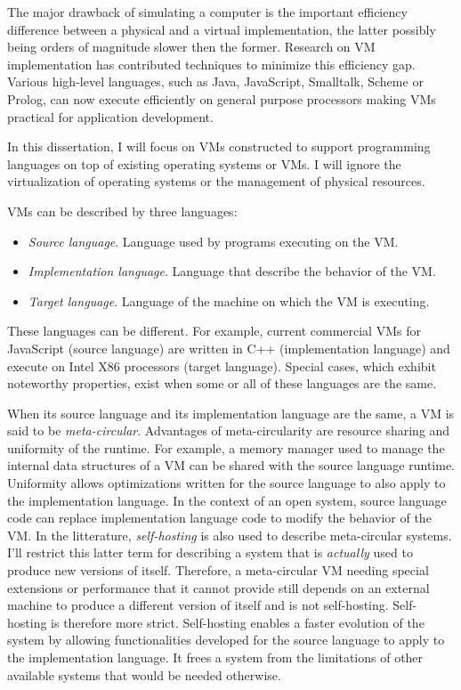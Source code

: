 The major drawback of simulating a computer is the important efficiency
difference between a physical and a virtual implementation, the latter possibly
being orders of magnitude slower then the former. Research on VM
implementation has contributed techniques to minimize this efficiency gap.
Various high-level languages, such as Java, JavaScript, Smalltalk, Scheme or
Prolog, can now execute efficiently on general purpose processors making VMs
practical for application development.

In this dissertation, I will focus on VMs constructed to support programming
languages on top of existing operating systems or VMs. I will ignore the
virtualization of operating systems or the management of physical resources.

VMs can be described by three languages:
\begin{itemize}
    \item \textit{Source language}. Language used by programs executing on the VM.
    \item \textit{Implementation language}. Language that describe the behavior of the VM.
    \item \textit{Target language}. Language of the machine on which the VM is executing.
\end{itemize}
These languages can be different. For example, current commercial VMs for
JavaScript (source language) are written in C++ (implementation language) and
execute on Intel X86 processors (target language). Special cases, which exhibit
noteworthy properties, exist when some or all of these languages are the same. 

When its source language and its implementation language are the same, a VM is
said to be \textit{meta-circular}. Advantages of meta-circularity are resource
sharing and uniformity of the runtime. For example, a memory manager used to
manage the internal data structures of a VM can be shared with the source
language runtime. Uniformity allows optimizations written for the source
language to also apply to the implementation language. In the context of an
open system, source language code can replace implementation language code to
modify the behavior of the VM. In the litterature, \textit{self-hosting} is
also used to describe meta-circular systems. I'll restrict this latter term for
describing a system that is \textit{actually} used to produce new versions of
itself.  Therefore, a meta-circular VM needing special extensions or
performance that it cannot provide still depends on an external machine to
produce a different version of itself and is not self-hosting. Self-hosting is
therefore more strict.  Self-hosting enables a faster evolution of the system
by allowing functionalities developed for the source language to apply to the
implementation language. It frees a system from the limitations of other
available systems that would be needed otherwise.

